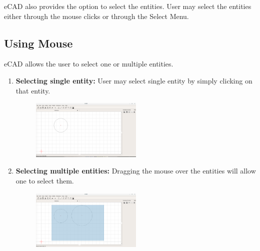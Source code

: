 eCAD also provides the option to select the entities. User may select the entities either through the mouse clicks or through the Select Menu.
\subsection{Using Mouse}
eCAD allows the user to select one or multiple entities.
\begin{enumerate}
\item \textbf{Selecting single entity:} User may select single entity by simply clicking on that entity.
\begin{figure}[h!]
\centering
\includegraphics[width=0.5\textwidth]{images/mouseSelect.png}
\end{figure}
\item \textbf{Selecting multiple entities:} Dragging the mouse over the entities will allow one to select them.
\begin{figure}[h!]
\centering
\includegraphics[width=0.5\textwidth]{images/multiple.png}
\end{figure}
\end{enumerate}
